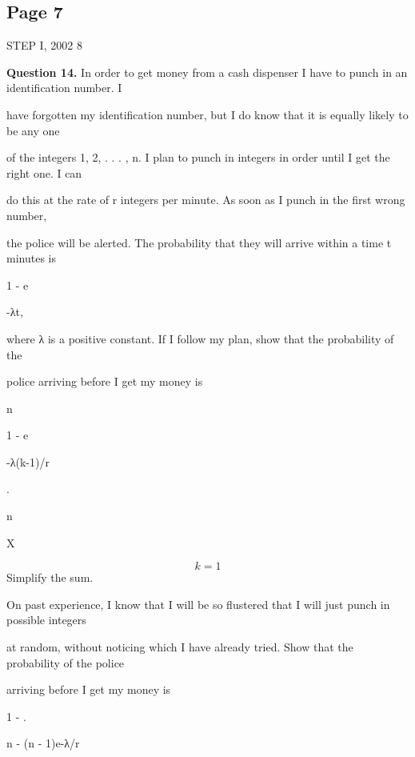 \documentclass[12pt]{article}
\begin{document}
\subsection*{Page 7}
\begin{flushleft}
STEP I, 2002 8\par
\bigskip\textbf{Question 14.} In order to get money from a cash dispenser I have to punch in an identification number. I\par
have forgotten my identification number, but I do know that it is equally likely to be any one\par
of the integers 1, 2, . . . , n. I plan to punch in integers in order until I get the right one. I can\par
do this at the rate of r integers per minute. As soon as I punch in the first wrong number,\par
the police will be alerted. The probability that they will arrive within a time t minutes is\par
1 - e\par
-λt,\par
where λ is a positive constant. If I follow my plan, show that the probability of the\par
police arriving before I get my money is\par
n\par
1 - e\par
-λ(k-1)/r\par
.\par
n\par
X\par
\[k=1\]
Simplify the sum.\par
On past experience, I know that I will be so flustered that I will just punch in possible integers\par
at random, without noticing which I have already tried. Show that the probability of the police\par
arriving before I get my money is\par
1 - .\par
n - (n - 1)e-λ/r\par
\end{flushleft}
\end{document}
